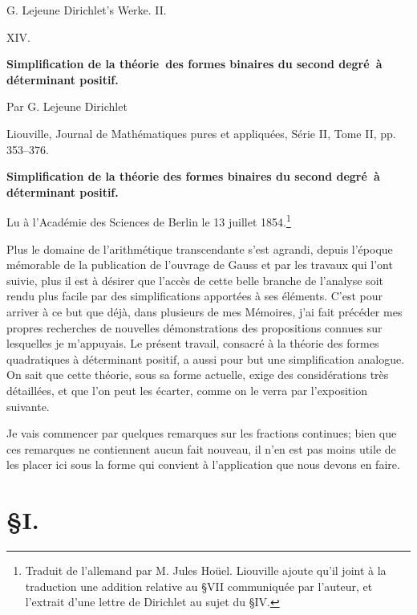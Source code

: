 \documentclass[11pt]{article}
\begin{document}
\begin{center}
{\Large G. Lejeune Dirichlet's Werke. II.}\par\vspace{1.2em}
{\Large XIV.}\par\vspace{0.5em}
{\LARGE \textbf{Simplification de la théorie\ des formes binaires du second degré\ à déterminant positif.}}\par\vspace{1em}
{\large Par G. Lejeune Dirichlet}\par\vspace{0.5em}
{\small Liouville, Journal de Mathématiques pures et appliquées, Série II, Tome II, pp. 353--376.}
\end{center}

\begin{center}
{\large \textbf{Simplification de la théorie des formes binaires du second degré\ à déterminant positif.}}\par
{\small Lu à l'Académie des Sciences de Berlin le 13 juillet 1854.\footnote{Traduit de l'allemand par M. Jules Hoüel. Liouville ajoute qu'il joint à la traduction une addition relative au \S VII communiquée par l'auteur, et l'extrait d'une lettre de Dirichlet au sujet du \S IV.}}
\end{center}

Plus le domaine de l'arithmétique transcendante s'est agrandi, depuis l'époque mémorable de la publication de l'ouvrage de Gauss et par les travaux qui l'ont suivie, plus il est à désirer que l'accès de cette belle branche de l'analyse soit rendu plus facile par des simplifications apportées à ses éléments. C'est pour arriver à ce but que déjà, dans plusieurs de mes Mémoires, j'ai fait précéder mes propres recherches de nouvelles démonstrations des propositions connues sur lesquelles je m'appuyais. Le présent travail, consacré à la théorie des formes quadratiques à déterminant positif, a aussi pour but une simplification analogue. On sait que cette théorie, sous sa forme actuelle, exige des considérations très détaillées, et que l'on peut les écarter, comme on le verra par l'exposition suivante.

Je vais commencer par quelques remarques sur les fractions continues; bien que ces remarques ne contiennent aucun fait nouveau, il n'en est pas moins utile de les placer ici sous la forme qui convient à l'application que nous devons en faire.

\section*{\S I.}
\end{document}
